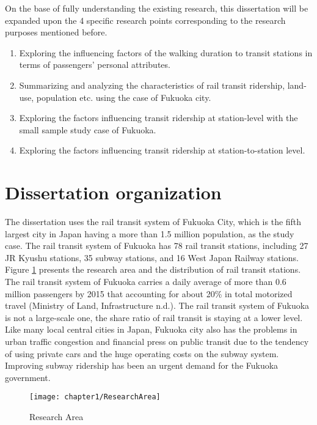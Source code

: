 On the base of fully understanding the existing research, this dissertation will be expanded upon the 4 specific research points corresponding to the research purposes mentioned before.

\begin{enumerate}
	\setlength{\parskip}{0\baselineskip} %
	\item Exploring the influencing factors of the walking duration to transit stations in terms of passengers' personal attributes. 
	\item Summarizing and analyzing the characteristics of rail transit ridership, land-use, population etc. using the case of Fukuoka city.
	\item Exploring the factors influencing transit ridership at station-level with the small sample study case of Fukuoka. 
	\item Exploring the factors influencing transit ridership at station-to-station level.
	\setlength{\parskip}{0.7\baselineskip} %
\end{enumerate}

%
\section{Dissertation organization}
The dissertation uses the rail transit system of Fukuoka City, which is the fifth largest city in Japan having a more than 1.5 million population, as the study case. The rail transit system of Fukuoka has 78 rail transit stations, including 27 JR Kyushu stations, 35 subway stations, and 16 West Japan Railway stations. Figure \ref{fig:chp1:ResearchArea} presents the research area and the distribution of rail transit stations. The rail transit system of Fukuoka carries a daily average of more than 0.6 million passengers by 2015 that accounting for about 20\% in total motorized travel (Ministry of Land, Infrastructure n.d.). The rail transit system of Fukuoka is not a large-scale one, the share ratio of rail transit is staying at a lower level. Like many local central cities in Japan, Fukuoka city also has the problems in urban traffic congestion and financial press on public transit due to the tendency of using private cars and the huge operating costs on the subway system. Improving subway ridership has been an urgent demand for the Fukuoka government.

\begin{figure}[htbp]
	\centering
	\texttt{[image: chapter1/ResearchArea]}
	\caption{Research Area}
	\label{fig:chp1:ResearchArea}
\end{figure}

